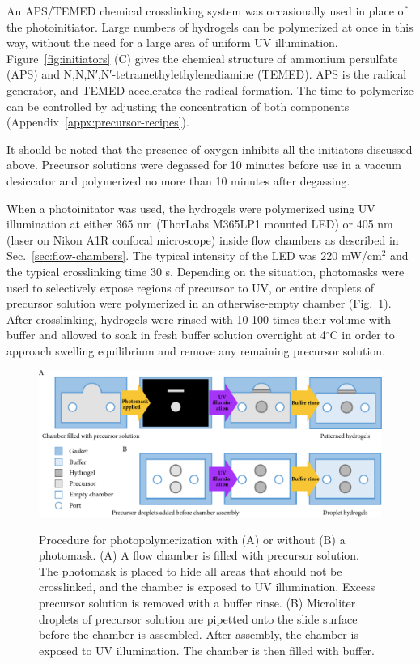 An APS/TEMED chemical crosslinking system was occasionally used in place of the photoinitiator.  Large numbers of hydrogels can be polymerized at once in this way, without the need for a large area of uniform UV illumination.  Figure~\ref{fig:initiators} (C) gives the chemical structure of ammonium persulfate (APS) and N,N,N′,N′-tetramethylethylenediamine (TEMED).  APS is the radical generator, and TEMED accelerates the radical formation.  The time to polymerize can be controlled by adjusting the concentration of both components (Appendix~\ref{appx:precursor-recipes}).

It should be noted that the presence of oxygen inhibits all the initiators discussed above.  Precursor solutions were degassed for 10 minutes before use in a vaccum desiccator and polymerized no more than 10 minutes after degassing.

When a photoinitator was used, the hydrogels were polymerized using UV illumination at either 365 nm (ThorLabs M365LP1 mounted LED) or 405 nm (laser on Nikon A1R confocal microscope) inside flow chambers as described in Sec.~\ref{sec:flow-chambers}.  The typical intensity of the LED was 220 mW/cm$^2$ and the typical crosslinking time 30 s.  Depending on the situation, photomasks were used to selectively expose regions of precursor to UV, or entire droplets of precursor solution were polymerized in an otherwise-empty chamber (Fig.~\ref{fig:photomask}).  After crosslinking, hydrogels were rinsed with 10-100 times their volume with buffer and allowed to soak in fresh buffer solution overnight at 4$^\circ$C in order to approach swelling equilibrium and remove any remaining precursor solution.

\begin{figure}
\caption{Procedure for photopolymerization with (A) or without (B) a photomask. (A) A flow chamber is filled with precursor solution.  The photomask is placed to hide all areas that should not be crosslinked, and the chamber is exposed to UV illumination.  Excess precursor solution is removed with a buffer rinse. (B) Microliter droplets of precursor solution are pipetted onto the slide surface before the chamber is assembled.  After assembly, the chamber is exposed to UV illumination.  The chamber is then filled with buffer.}
\centering
\includegraphics[width=\textwidth]{figs/ch03/photomask}
\label{fig:photomask}
\end{figure}

